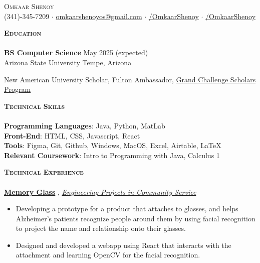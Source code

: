 \documentclass[a4paper]{article}
\newcommand{\lineunder} {
    \vspace*{-8pt} \\
    \hspace*{-18pt} \hrulefill \\
}
\newcommand{\header} [1] {
    {\hspace*{-15pt}\vspace*{3pt} \textsc{#1}}
    \vspace*{-6pt} \lineunder
}
\begin{document}
\vspace*{-30.9pt}




\begin{center}
	{\Huge \scshape {Omkaar Shenoy}}\\
	\vspace{2mm}
	\faPhone  \hspace{0.5mm} (341)-345-7209 $\cdot$ \href{mailto:omkaarshenoyos@gmail.com}{\faEnvelope \hspace{0.5mm} omkaarshenoyos@gmail.com} \hspace{0.5mm}   $\cdot$ \href{https://www.linkedin.com/in/OmkaarShenoy/}{\faLinkedin/OmkaarShenoy} $\cdot$ \href{https://github.com/OmkaarShenoy}{\faGithub/OmkaarShenoy}
	
\end{center}




    \header{\textbf{Education}}

\textbf{BS Computer Science} \hfill May 2025 (expected)
\\ Arizona State University \hfill Tempe, Arizona
 
New American University Scholar, Fulton Ambassador, \href{https://gcsp.engineering.asu.edu/}{Grand Challenge Scholars Program} \faExternalLink \\


\vspace{1mm}

\header{\textbf{Technical Skills}}



\textbf{Programming Languages}: Java, Python, MatLab \\
\textbf{Front-End}: HTML, CSS, Javascript, React \\
\textbf{Tools}: Figma, Git, Github, Windows, MacOS, Excel, Airtable, \LaTeX \\
\textbf{Relevant Coursework}: Intro to Programming with Java, Calculus 1 \\
\vspace{1mm}


\header{\textbf{Technical Experience}}
\href{https://www.memoryglass.net}{\textbf{Memory Glass}} \faExternalLink, \href{https://epics.engineering.asu.edu/}{\textit{Engineering Projects in Community Service}} \faExternalLink
\begin{itemize}
    \item Developing a prototype for a product that attaches to glasses, and helps Alzheimer's patients recognize people around them by using facial recognition to project the name and relationship onto their glasses. 
    \item Designed and developed a webapp using React that interacts with the attachment and learning OpenCV for the facial recognition. 
\end{itemize}
\end{document}
